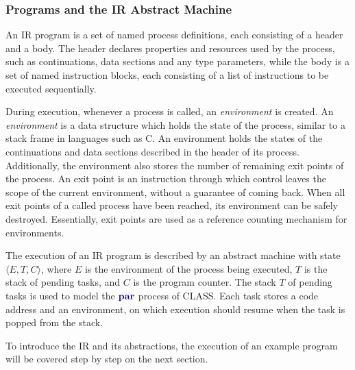 \documentclass[sigconf,nonacm,natbib=true]{acmart}
\begin{document}

\subsubsection{Programs and the IR Abstract Machine}

An \ac{IR} program is a set of named process definitions, each consisting of a header and a body. The header declares properties and resources used by the process, such as continuations, data sections and any type parameters, while the body is a set of named instruction blocks, each consisting of a list of instructions to be executed sequentially.

During execution, whenever a process is called, an \textit{environment} is created. An \textit{environment} is a data structure which holds the state of the process, similar to a stack frame in languages such as C. An environment holds the states of the continuations and data sections described in the header of its process. Additionally, the environment also stores the number of remaining exit points of the process. An exit point is an instruction through which control leaves the scope of the current environment, without a guarantee of coming back. When all exit points of a called process have been reached, its environment can be safely destroyed. Essentially, exit points are used as a reference counting mechanism for environments.

The execution of an \ac{IR} program is described by an abstract machine with state $\langle E, T, C \rangle$, where $E$ is the environment of the process being executed, $T$ is the stack of pending tasks, and $C$ is the program counter. The stack $T$ of pending tasks is used to model the $\parp$ process of \ac{CLASS}. Each task stores a code address and an environment, on which execution should resume when the task is popped from the stack.

To introduce the \ac{IR} and its abstractions, the execution of an example program will be covered step by step on the next section.
\end{document}
